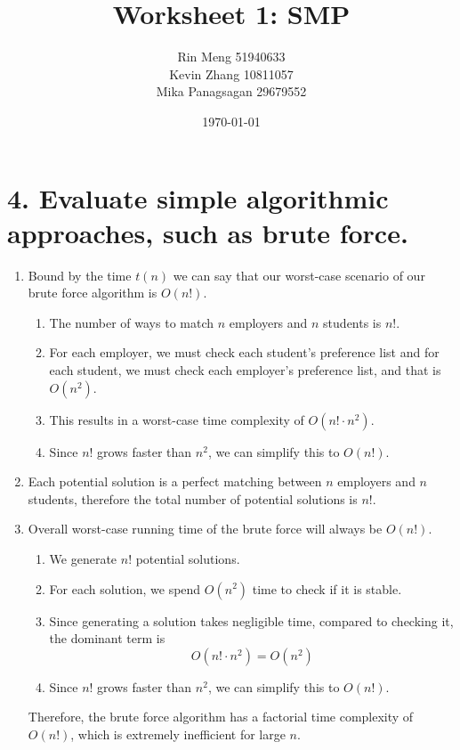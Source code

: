\documentclass[12pt]{article}
\title{Worksheet 1: SMP}
\author{Rin Meng 51940633\\ Kevin Zhang 10811057\\ Mika Panagsagan 29679552}
\date{\today}
\begin{document}
\maketitle

\section{4. Evaluate simple algorithmic approaches, such as brute force.}

\begin{enumerate}
    \item Bound by the time $t(n)$ we can say that our worst-case scenario of our brute force algorithm is
    $O(n!)$.
        \begin{enumerate}[-]
            \item The number of ways to match $n$ employers and $n$ students is $n!$.
            \item For each employer, we must check each student's preference list and 
            for each student, we must check each employer's preference list, and that is $O(n^2)$.
            \item This results in a worst-case time complexity of $O(n! \cdot n^2)$.
            \item Since $n$! grows faster than $n^2$, we can simplify this to $O(n!)$.
        \end{enumerate}
    \item Each potential solution is a perfect matching between $n$ employers and $n$ students, therefore the total
    number of potential solutions is $n$!.
    \item Overall worst-case running time of the brute force will always be $O(n!)$.
        \begin{enumerate}[-]
            \item We generate $n$! potential solutions.
            \item For each solution, we spend $O(n^2)$ time to check if it is stable.
            \item Since generating a solution takes negligible time, compared to checking it, the dominant 
            term is 
            \[ O(n! \cdot n^2) = O(n^2) \]
            \item Since $n$! grows faster than $n^2$, we can simplify this to $O(n!)$.
        \end{enumerate}
    Therefore, the brute force algorithm has a factorial time complexity of $O(n!)$, which is extremely inefficient for
    large $n$.
\end{enumerate}
\end{document}
